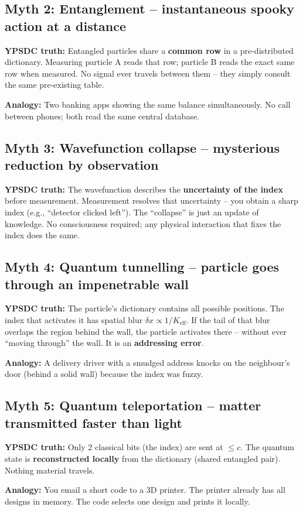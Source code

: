 \documentclass[12pt,a4paper]{article}
\begin{document}
	\subsection{Myth 2: Entanglement -- instantaneous spooky action at a distance}
	\textbf{YPSDC truth:} Entangled particles share a \textbf{common row} in a pre‑distributed dictionary. Measuring particle A reads that row; particle B reads the exact same row when measured. No signal ever travels between them -- they simply consult the same pre‑existing table.
	\par
	\textbf{Analogy:} Two banking apps showing the same balance simultaneously. No call between phones; both read the same central database.
	
	\subsection{Myth 3: Wavefunction collapse -- mysterious reduction by observation}
	\textbf{YPSDC truth:} The wavefunction describes the \textbf{uncertainty of the index} before measurement. Measurement resolves that uncertainty -- you obtain a sharp index (e.g., ``detector clicked left''). The ``collapse'' is just an update of knowledge. No consciousness required; any physical interaction that fixes the index does the same.
	
	\subsection{Myth 4: Quantum tunnelling -- particle goes through an impenetrable wall}
	\textbf{YPSDC truth:} The particle's dictionary contains all possible positions. The index that activates it has spatial blur \(\delta x \propto 1/K_{\mathrm{eff}}\). If the tail of that blur overlaps the region behind the wall, the particle activates there -- without ever ``moving through'' the wall. It is an \textbf{addressing error}.
	\par
	\textbf{Analogy:} A delivery driver with a smudged address knocks on the neighbour's door (behind a solid wall) because the index was fuzzy.
	
	\subsection{Myth 5: Quantum teleportation -- matter transmitted faster than light}
	\textbf{YPSDC truth:} Only 2 classical bits (the index) are sent at \(\le c\). The quantum state is \textbf{reconstructed locally} from the dictionary (shared entangled pair). Nothing material travels.
	\par
	\textbf{Analogy:} You email a short code to a 3D printer. The printer already has all designs in memory. The code selects one design and prints it locally.
	
\end{document}
